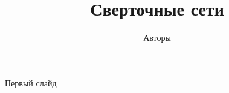 \documentclass{beamer}
\title{Сверточные сети}
\author{Авторы}
\begin{document}
	
	\begin{frame}
		\titlepage
	\end{frame}
	
	\begin{frame}
		Первый слайд
	\end{frame}
\end{document}
